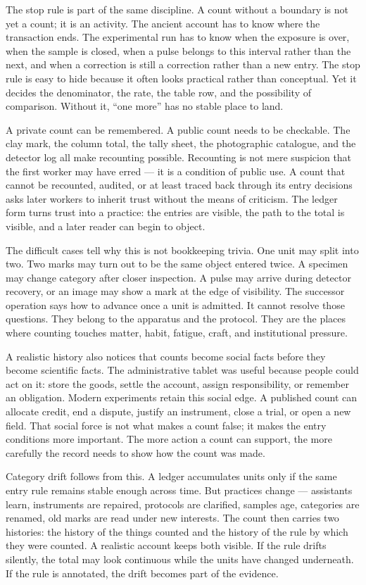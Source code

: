 The stop rule is part of the same discipline. A count without a boundary is
not yet a count; it is an activity. The ancient account has to know where
the transaction ends. The experimental run has to know when the exposure
is over, when the sample is closed, when a pulse belongs to this interval
rather than the next, and when a correction is still a correction rather
than a new entry. The stop rule is easy to hide because it often looks
practical rather than conceptual. Yet it decides the denominator, the rate,
the table row, and the possibility of comparison. Without it, ``one more''
has no stable place to land.

A private count can be remembered. A public count needs to be checkable.
The clay mark, the column total, the tally sheet, the photographic
catalogue, and the detector log all make recounting possible. Recounting is
not mere suspicion that the first worker may have erred --- it is a
condition of public use. A count that cannot be recounted, audited, or at
least traced back through its entry decisions asks later workers to inherit
trust without the means of criticism. The ledger form turns trust into a
practice: the entries
are visible, the path to the total is visible, and a later reader can begin
to object.

The difficult cases tell why this is not bookkeeping trivia. One unit may
split into two. Two marks may turn out to be the same object entered twice.
A specimen may change category after closer inspection. A pulse may arrive
during detector recovery, or an image may show a mark at the edge of
visibility. The successor operation says how to advance once a unit is
admitted. It cannot resolve those questions. They belong to the apparatus
and the protocol. They are the places where counting touches matter, habit,
fatigue, craft, and institutional pressure.

A realistic history also notices that counts become social facts before
they become scientific facts. The administrative tablet was useful because
people could act on it: store the goods, settle the account, assign
responsibility, or remember an obligation. Modern experiments retain this
social edge. A published count can allocate credit, end a dispute, justify
an instrument, close a trial, or open a new field. That social force is not
what makes a count false; it makes the entry conditions more important.
The more action a count can support, the more carefully the record needs
to show how the count was made.

Category drift follows from this. A ledger accumulates units only if the
same entry rule remains stable enough across time. But practices change ---
assistants learn, instruments are repaired, protocols are clarified, samples
age, categories are renamed, old marks are read under new interests. The
count then carries two histories: the history of the things counted and the
history of the rule by which they were counted. A realistic account keeps
both visible. If the rule drifts silently, the total may look continuous
while the units have changed underneath. If the rule is annotated, the
drift becomes part of the evidence.

